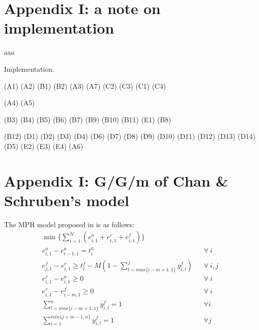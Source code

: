 \documentclass[]{interact}
\theoremstyle{plain}%
\theoremstyle{definition}
\theoremstyle{remark}
\begin{document}
\newpage
\section*{Appendix I: a note on implementation}
aaa
\begin{algorithm}
	\label{algo:implement_MPR}
	\caption{Implementation.}
	\begin{algorithmic}[1]
		\STATE (A1) (A2) (B1) (B2)
		\ENDFOR
		\STATE (A3) (A7) (C2) (C3)
		\ENDFOR
		\STATE (C1) (C4)
		\ENDFOR	
		\ENDFOR
		
		\STATE (A4) (A5)
		\ENDFOR
		
		\STATE (B3) (B4) (B5) (B6)
		\ENDFOR
		\STATE (B7) (B9) (B10)
		\ENDFOR
		\STATE (B11) (E1)
		\ENDFOR	
		\STATE (B8)
		\ENDFOR
		
		\STATE (B12)
		\ENDFOR	
		\STATE (D1) (D2) (D3) (D4)
		\ENDFOR	
		\STATE (D6) (D7) (D8) (D9) (D10) (D11) (D12) (D13) (D14)
		\ENDFOR
		\STATE (D5) (E2) (E3) (E4)
		\ENDFOR	
		\ENDFOR
		\STATE (A6)
	\end{algorithmic}
\end{algorithm}




\newpage
\section*{Appendix I: G/G/m of Chan \& Schruben's model}

The MPR model proposed in \cite{chan2008optimization} is as follows:
\begin{eqnarray}
\min\{\sum_{i=1}^N (e^{a}_{i,1}+e^{r}_{i,1}+e^{f}_{i,1})\}\nonumber\\
e^{a}_{i,1} - e^{a}_{i-1,1} = t^{a}_{i}&&\forall\ i \label{GG1erg:1}\\
e^{f}_{j,1} - e^{r}_{i,1} \ge t^{f}_{i}-M(1-\sum_{l=max\{i-m+1,1\}}^{j} y^{f}_{i,l})&&\forall\ i,j\label{GG1erg:2}\\
e^{r}_{i,1} - e^{a}_{i,1} \ge 0&&\forall\ i\label{GG1erg:3}\\
e^{r}_{i,1} - e^{f}_{i-m,1} \ge 0&&\forall\ i\label{GG1erg:4}\\
\sum_{l=max\{i-m+1,1\}}^n y^{f}_{i,l} = 1 && \forall i\\
\sum_{i=1}^{min\{j+m-1,n\}} y^{f}_{i,l} = 1 && \forall j
\end{eqnarray}
\end{document}
